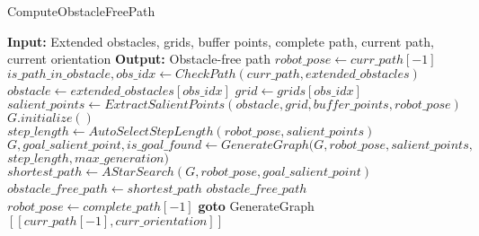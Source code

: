     


    

    



\begin{algorithm}[H]
    \caption{ComputeObstacleFreePath}
    \begin{algorithmic}[1]
        \Statex \textbf{Input:} Extended obstacles, grids, buffer points, complete path, current path, current orientation
        \Statex \textbf{Output:} Obstacle-free path
        \newline
        \State $robot\_pose \gets curr\_path[-1]$
        \State $is\_path\_in\_obstacle, obs\_idx \gets CheckPath(curr\_path, extended\_obstacles)$
            \State $obstacle \gets extended\_obstacles[obs\_idx]$
            \State $grid \gets grids[obs\_idx]$
            \State $salient\_points \gets ExtractSalientPoints(obstacle, grid, buffer\_points, robot\_pose)$
            \State $G.initialize()$
            \State $step\_length \gets AutoSelectStepLength(robot\_pose, salient\_points)$
            \State $G, goal\_salient\_point, is\_goal\_found \gets GenerateGraph(G, robot\_pose, salient\_points,$ 
            \Statex \hspace{9cm} $step\_length, max\_generation)$
                \State $shortest\_path \gets AStarSearch(G, robot\_pose, goal\_salient\_point)$
                \State $obstacle\_free\_path \gets shortest\_path$
                \State \Return $obstacle\_free\_path$
            \Else
                \State $robot\_pose \gets complete\_path[-1]$  
                \State \textbf{goto} GenerateGraph
            \EndIf
        \Else
            \State \Return $[[curr\_path[-1], curr\_orientation]]$
        \EndIf
    \end{algorithmic}
\end{algorithm}



